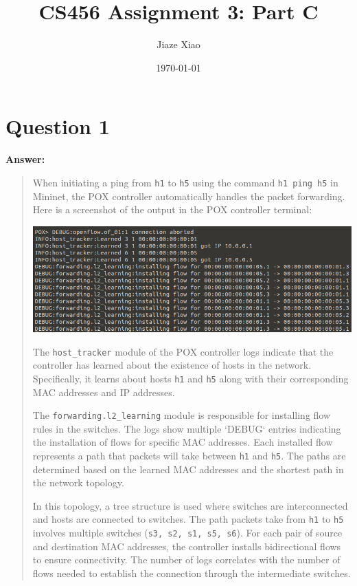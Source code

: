 \documentclass{article}
\title{CS456 Assignment 3: Part C}
\author{Jiaze Xiao}
\affil{20933691}
\date{\today}
\begin{document}
\maketitle

\section*{Question 1}
\textbf{Answer:}
\begin{quote}
    When initiating a ping from \texttt{h1} to \texttt{h5} using the command \texttt{h1 ping h5} in Mininet, the POX controller automatically handles the packet forwarding. Here is a screenshot of the output in the POX controller terminal:

    \begin{center}
        \includegraphics[scale=0.7]{screenshot/pox.png}
    \end{center}

    The \texttt{host\_tracker} module of the POX controller logs indicate that the controller has learned about the existence of hosts in the network. Specifically, it learns about hosts \texttt{h1} and \texttt{h5} along with their corresponding MAC addresses and IP addresses.

    The \texttt{forwarding.l2\_learning} module is responsible for installing flow rules in the switches. The logs show multiple `DEBUG` entries indicating the installation of flows for specific MAC addresses. Each installed flow represents a path that packets will take between \texttt{h1} and \texttt{h5}. The paths are determined based on the learned MAC addresses and the shortest path in the network topology.

    In this topology, a tree structure is used where switches are interconnected and hosts are connected to switches. The path packets take from \texttt{h1} to \texttt{h5} involves multiple switches (\texttt{s3, s2, s1, s5, s6}). For each pair of source and destination MAC addresses, the controller installs bidirectional flows to ensure connectivity. The number of logs correlates with the number of flows needed to establish the connection through the intermediate switches.
\end{quote}
\newpage
\end{document}
